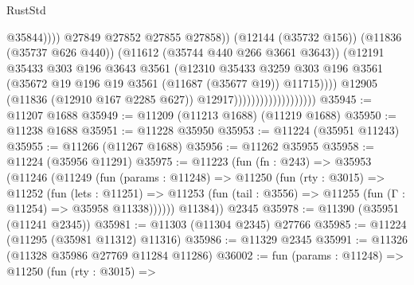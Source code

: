 \begin{lexlean}{RustStd}
\begin{coremodule}
                                                        @35844))))
                                                @27849
                                                @27852
                                                @27855
                                                @27858))
                                            (@12144 (@35732 @156))
                                            (@11836 (@35737 @626 @440))
                                            (@11612 (@35744 @440 @266 @3661 @3643))
                                            (@12191
                                              @35433
                                              @303
                                              @196
                                              @3643
                                              @3561
                                              (@12310
                                                @35433
                                                @3259
                                                @303
                                                @196
                                                @3561
                                                (@35672
                                                  @19
                                                  @196
                                                  @19
                                                  @3561
                                                  (@11687 (@35677 @19))
                                                  @11715))))
                                          @12905
                                          (@11836 (@12910 @167 @2285 @627))
                                          @12917)))))))))))))))))))
@35945 := @11207 @1688
@35949 := @11209 (@11213 @1688) (@11219 @1688)
@35950 := @11238 @1688
@35951 := @11228 @35950
@35953 := @11224 (@35951 @11243)
@35955 := @11266 (@11267 @1688)
@35956 := @11262 @35955
@35958 := @11224 (@35956 @11291)
@35975 := @11223
    (fun (fn : @243) =>
    @35953
      (@11246
        (@11249
          (fun (params : @11248) =>
          @11250
            (fun (rty : @3015) =>
            @11252
              (fun (lets : @11251) =>
              @11253 (fun (tail : @3556) => @11255 (fun (Γ : @11254) => @35958 @11338))))))
        @11384))
    @2345
@35978 := @11390 (@35951 (@11241 @2345))
@35981 := @11303 (@11304 @2345) @27766
@35985 := @11224 (@11295 (@35981 @11312) @11316)
@35986 := @11329 @2345
@35991 := @11326 (@11328 @35986 @27769 @11284 @11286)
@36002 := fun (params : @11248) =>
  @11250
    (fun (rty : @3015) =>

\end{coremodule}
\end{lexlean}
